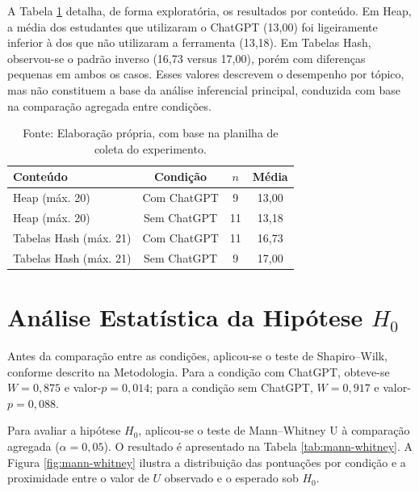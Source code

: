 A Tabela \ref{tab:desempenho-topico} detalha, de forma exploratória, os resultados por conteúdo. Em Heap, a média dos estudantes que utilizaram o ChatGPT (13,00) foi ligeiramente inferior à dos que não utilizaram a ferramenta (13,18). Em Tabelas Hash, observou-se o padrão inverso (16,73 versus 17,00), porém com diferenças pequenas em ambos os casos. Esses valores descrevem o desempenho por tópico, mas não constituem a base da análise inferencial principal, conduzida com base na comparação agregada entre condições.

\begin{table}[!ht]
    \centering
    \caption{Desempenho médio por conteúdo e condição de uso do ChatGPT}
    \label{tab:desempenho-topico}
    \begin{tabular}{l c c c}
        \hline
        \textbf{Conteúdo} & \textbf{Condição} & \textbf{$n$} & \textbf{Média} \\
        \hline
        Heap (máx. 20) & Com ChatGPT & 9 & 13,00 \\
        Heap (máx. 20) & Sem ChatGPT & 11 & 13,18 \\
        Tabelas Hash (máx. 21) & Com ChatGPT & 11 & 16,73 \\
        Tabelas Hash (máx. 21) & Sem ChatGPT & 9 & 17,00 \\
        \hline
    \end{tabular}

    \vspace{0.2cm}
    \caption*{Fonte: Elaboração própria, com base na planilha de coleta do experimento.}
\end{table}

\section{Análise Estatística da Hipótese $H_{0}$}
\label{sec:analise-estatistica}

Antes da comparação entre as condições, aplicou-se o teste de Shapiro--Wilk, conforme descrito na Metodologia. Para a condição com ChatGPT, obteve-se $W = 0{,}875$ e valor-$p = 0{,}014$; para a condição sem ChatGPT, $W = 0{,}917$ e valor-$p = 0{,}088$.

Para avaliar a hipótese $H_{0}$, aplicou-se o teste de Mann--Whitney U à comparação agregada ($\alpha = 0{,}05$). O resultado é apresentado na Tabela \ref{tab:mann-whitney}. A Figura \ref{fig:mann-whitney} ilustra a distribuição das pontuações por condição e a proximidade entre o valor de $U$ observado e o esperado sob $H_{0}$.

